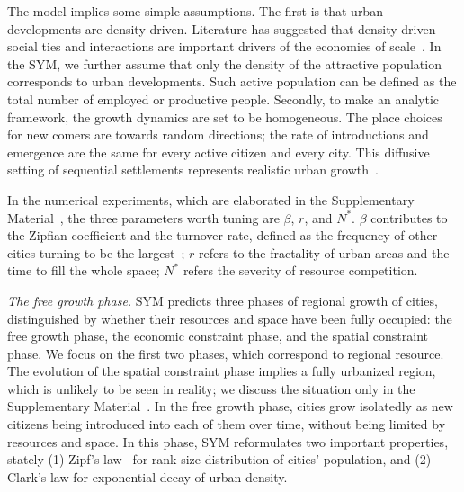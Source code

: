 \documentclass[reprint,unsortedaddress,amsmath,amssymb,aps,prl,showkeys]{revtex4-2}
\begin{document}
The model implies some simple assumptions. The first is that urban developments are density-driven. Literature has suggested that density-driven social ties and interactions are important drivers of the economies of scale~\cite{pan2013urban, girardin2009quantifying, batty1992form}. In the SYM, we further assume that only the density of the attractive population corresponds to urban developments. Such active population can be defined as the total number of employed or productive people. Secondly, to make an analytic framework, the growth dynamics are set to be homogeneous. The place choices for new comers are towards random directions; the rate of introductions and emergence are the same for every active citizen and every city. This diffusive setting of sequential settlements represents realistic urban growth~\cite{RevModPhys.87.925}. 

In the numerical experiments, which are elaborated in the Supplementary Material~\cite{SuppInfo}, the three parameters worth tuning are $\beta$, $r$, and $N^*$. $\beta$ contributes to the Zipfian coefficient and the turnover rate, defined as the frequency of other cities turning to be the largest~\cite{rooney2006structural}; $r$ refers to the fractality of urban areas and the time to fill the whole space; $N^*$ refers the severity of resource competition. 


\textit{The free growth phase.} SYM predicts three phases of regional growth of cities, distinguished by whether their resources and space have been fully occupied: the free growth phase, the economic constraint phase, and the spatial constraint phase. We focus on the first two phases, which correspond to regional resource. The evolution of the spatial constraint phase implies a fully urbanized region, which is unlikely to be seen in reality; we discuss the situation only in the Supplementary Material~\cite{SuppInfo}. In the free growth phase, cities grow isolatedly as new citizens being introduced into each of them over time, without being limited by resources and space. In this phase, SYM reformulates two important properties, stately (1) Zipf's law~\cite{gabaix1999zipf's} for rank size distribution of cities' population, and (2) Clark's law for exponential decay of urban density\cite{clark1951urban}. 
\end{document}
